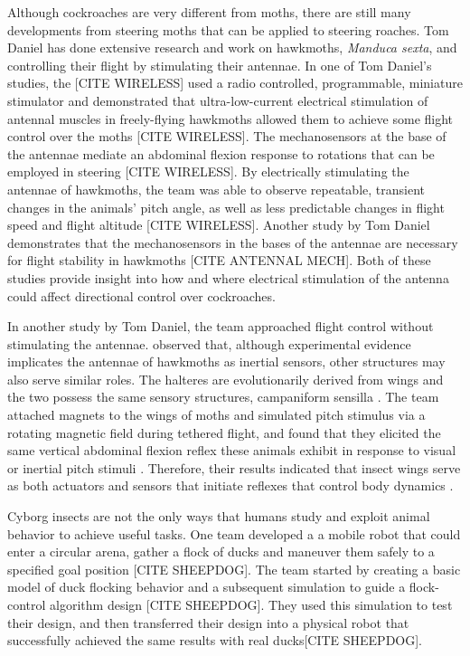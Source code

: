 Although cockroaches are very different from moths, there are still many developments from steering moths that can be applied to steering roaches. Tom Daniel has done extensive research and work on hawkmoths, \textit{Manduca sexta}, and controlling their flight by stimulating their antennae. In one of Tom Daniel's studies, the [CITE WIRELESS] used a radio controlled, programmable, miniature stimulator and demonstrated that ultra-low-current electrical stimulation of antennal muscles in freely-flying hawkmoths allowed them to achieve some flight control over the moths [CITE WIRELESS]. The mechanosensors at the base of the antennae mediate an abdominal flexion response to rotations that can be employed in steering [CITE WIRELESS]. By electrically stimulating the antennae of hawkmoths, the team was able to observe repeatable, transient changes in the animals’ pitch angle, as well as less predictable changes in flight speed and flight altitude [CITE WIRELESS]. Another study by Tom Daniel demonstrates that the mechanosensors in the bases of the antennae are necessary for flight stability in hawkmoths [CITE ANTENNAL MECH]. Both of these studies provide insight into how and where electrical stimulation of the antenna could affect directional control over cockroaches.

In another study by Tom Daniel, the team approached flight control without stimulating the antennae. \citet{Dickerson2014}
observed that, although experimental evidence implicates the antennae of hawkmoths as inertial sensors, other structures may also serve similar roles. The halteres are evolutionarily derived from wings and the two possess the same sensory structures, campaniform sensilla \citep{Dickerson2014}. The team attached magnets to the wings of moths and simulated pitch stimulus via a rotating magnetic field during tethered flight, and found that they elicited the same vertical abdominal flexion reflex these animals exhibit in response to visual or inertial pitch stimuli \citep{Dickerson2014}. Therefore, their results indicated that insect wings serve as both actuators and sensors that initiate reflexes that control body dynamics \citep{Dickerson2014}.

Cyborg insects are not the only ways that humans study and exploit animal behavior to achieve useful tasks. One team developed a a mobile robot that could enter a circular arena, gather a flock of ducks and maneuver them safely to a specified goal position [CITE SHEEPDOG]. The team started by creating a basic model of duck flocking behavior and a subsequent simulation to guide a flock-control algorithm design [CITE SHEEPDOG]. They used this simulation to test their design, and then transferred their design into a physical robot that successfully achieved the same results with real ducks[CITE SHEEPDOG].

